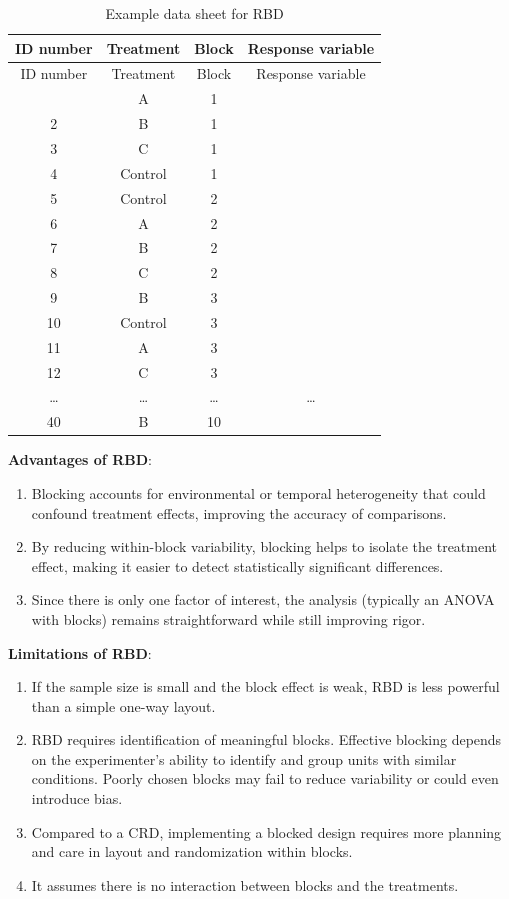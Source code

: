\documentclass[
]{book}
\providecommand{\tightlist}{%
  \setlength{\itemsep}{0pt}\setlength{\parskip}{0pt}}
\begin{document}
\begin{longtable}[]{@{}cccc@{}}
\caption{\label{tab:rbd} Example data sheet for RBD}\tabularnewline
\toprule\noalign{}
ID number & Treatment & Block & Response variable \\
\midrule\noalign{}
\endfirsthead
\toprule\noalign{}
ID number & Treatment & Block & Response variable \\
\midrule\noalign{}
\endhead
\bottomrule\noalign{}
\endlastfoot
1 & A & 1 & \\
2 & B & 1 & \\
3 & C & 1 & \\
4 & Control & 1 & \\
5 & Control & 2 & \\
6 & A & 2 & \\
7 & B & 2 & \\
8 & C & 2 & \\
9 & B & 3 & \\
10 & Control & 3 & \\
11 & A & 3 & \\
12 & C & 3 & \\
\ldots{} & \ldots{} & \ldots{} & \ldots{} \\
40 & B & 10 & \\
\end{longtable}

\textbf{Advantages of RBD}:

\begin{enumerate}
\def\labelenumi{\arabic{enumi}.}
\tightlist
\item
  Blocking accounts for environmental or temporal heterogeneity that could confound treatment effects, improving the accuracy of comparisons.
\item
  By reducing within-block variability, blocking helps to isolate the treatment effect, making it easier to detect statistically significant differences.
\item
  Since there is only one factor of interest, the analysis (typically an ANOVA with blocks) remains straightforward while still improving rigor.
\end{enumerate}

\textbf{Limitations of RBD}:

\begin{enumerate}
\def\labelenumi{\arabic{enumi}.}
\tightlist
\item
  If the sample size is small and the block effect is weak, RBD is less powerful than a simple one-way layout.
\item
  RBD requires identification of meaningful blocks. Effective blocking depends on the experimenter's ability to identify and group units with similar conditions. Poorly chosen blocks may fail to reduce variability or could even introduce bias.
\item
  Compared to a CRD, implementing a blocked design requires more planning and care in layout and randomization within blocks.
\item
  It assumes there is no interaction between blocks and the treatments.
\end{enumerate}
\end{document}
